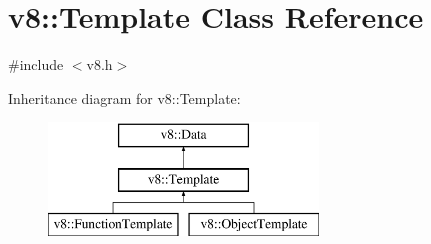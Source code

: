 \hypertarget{classv8_1_1_template}{}\section{v8\+:\+:Template Class Reference}
\label{classv8_1_1_template}


{\ttfamily \#include $<$v8.\+h$>$}

Inheritance diagram for v8\+:\+:Template\+:\begin{figure}[H]
\begin{center}
\leavevmode
\includegraphics[height=3.000000cm]{classv8_1_1_template}
\end{center}
\end{figure}
